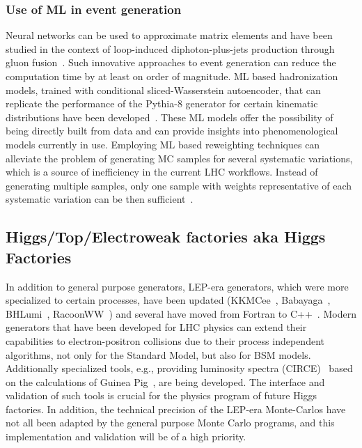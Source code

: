 \documentclass[10pt,a4paper]{article}
\begin{document}
\subsubsection{\texorpdfstring{Use of ML in event generation
}{Use of ML in event generation }}\label{use-of-ml-in-event-generation}

Neural networks can be used to approximate matrix elements and have been
studied in the context of loop-induced diphoton-plus-jets production
through gluon
fusion~\cite{Moodie:2022flt}. Such
innovative approaches to event generation can reduce the computation
time by at least on order of magnitude. ML based hadronization models,
trained with conditional sliced-Wasserstein autoencoder, that can
replicate the performance of the Pythia-8 generator for certain
kinematic distributions have been
developed~\cite{Ilten:2022jfm,
Bierlich:2023fmh}. These ML models offer the possibility of being
directly built from data and can provide insights into phenomenological
models currently in use. Employing ML based reweighting techniques can
alleviate the problem of generating MC samples for several systematic
variations, which is a source of inefficiency in the current LHC
workflows. Instead of generating multiple samples, only one sample with
weights representative of each systematic variation can be then
sufficient~\cite{CMS:2024jdl}.

\subsection{Higgs/Top/Electroweak factories aka Higgs
Factories}\label{higgstopelectroweak-factories-aka-higgs-factories}

In addition to general purpose generators, LEP-era generators, which
were more specialized to certain processes, have been updated
(KKMCee~\cite{Jadach:1999vf},
Babayaga~\cite{CarloniCalame:2003yt},
BHLumi~\cite{Jadach:1991by},
RacoonWW~\cite{Denner:2000bj}) and several
have moved from Fortran to
C++~\cite{Jadach:2022mbe}. Modern
generators that have been developed for LHC physics can extend their
capabilities to electron-positron collisions due to their process
independent algorithms, not only for the Standard Model, but also for
BSM models. Additionally specialized tools, e.g., providing luminosity
spectra (CIRCE)~\cite{Ohl:1996fi}
based on the calculations of Guinea
Pig~\cite{Schulte:1998au}, are being
developed. The interface and validation of such tools is crucial for the
physics program of future Higgs factories. In addition, the technical
precision of the LEP-era Monte-Carlos have not all been
adapted by the general purpose Monte Carlo programs, and this
implementation and validation will be of a high priority.
\end{document}
